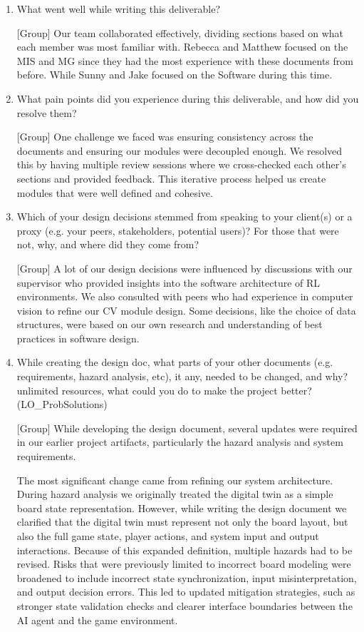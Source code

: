 \documentclass[12pt, titlepage]{article}
\begin{document}
\begin{enumerate}
  \item What went well while writing this deliverable? 
   
  [Group] Our team collaborated effectively, dividing sections based on
          what each member was most familiar with. Rebecca and Matthew
          focused on the MIS and MG since they had the most experience with
          these documents from before. While Sunny and Jake focused on the Software
          during this time.
  \item What pain points did you experience during this deliverable, and how  
    did you resolve them?

  [Group] One challenge we faced was ensuring consistency across the documents
          and ensuring our modules were decoupled enough. We resolved this by
          having multiple review sessions where we cross-checked each other's
          sections and provided feedback. This iterative process helped us
          create modules that were well defined and cohesive.
  
  
  \item Which of your design decisions stemmed from speaking to your client(s)
  or a proxy (e.g. your peers, stakeholders, potential users)? For those that
  were not, why, and where did they come from?
 
  [Group] A lot of our design decisions were influenced by discussions with
          our supervisor who provided insights into the software architecture
          of RL environments. We also consulted with peers who had experience
          in computer vision to refine our CV module design. Some decisions,
          like the choice of data structures, were based on our own research
          and understanding of best practices in software design.

  \item While creating the design doc, what parts of your other documents (e.g.
  requirements, hazard analysis, etc), it any, needed to be changed, and why?
  unlimited resources, what could you do to make the project better? (LO\_ProbSolutions)

   [Group]   While developing the design document, several updates were 
   required in our earlier project artifacts, particularly the hazard 
   analysis and system requirements.

The most significant change came from refining our system architecture. 
During hazard analysis we originally treated the digital twin as a 
simple board state representation. However, while writing the design 
document we clarified that the digital twin must represent not only 
the board layout, but also the full game state, player actions, and 
system input and output interactions. Because of this expanded definition, 
multiple hazards had to be revised. Risks that were previously limited 
to incorrect board modeling were broadened to include incorrect state 
 synchronization, input misinterpretation, and output decision errors. 
 This led to updated mitigation strategies, such as stronger state
 validation checks and clearer interface boundaries between the 
 AI agent and the game environment.


\end{enumerate}
\end{document}
